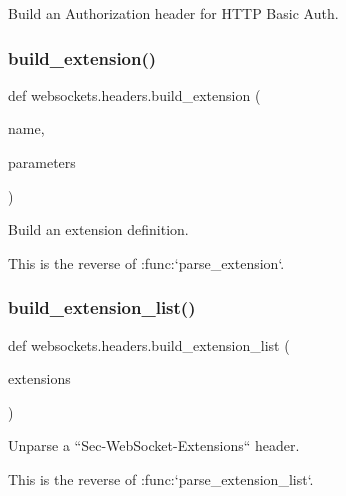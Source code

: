 \begin{DoxyVerb}Build an Authorization header for HTTP Basic Auth.\end{DoxyVerb}
 \mbox{\label{namespacewebsockets_1_1headers_ae0d3fad127ef68b2c2f7976c98966011}} 
\subsubsection{\texorpdfstring{build\+\_\+extension()}{build\_extension()}}
{\footnotesize\ttfamily def websockets.\+headers.\+build\+\_\+extension (\begin{DoxyParamCaption}\item[{}]{name,  }\item[{}]{parameters }\end{DoxyParamCaption})}

\begin{DoxyVerb}Build an extension definition.

This is the reverse of :func:`parse_extension`.\end{DoxyVerb}
 \mbox{\label{namespacewebsockets_1_1headers_a350e170144d586eb8c0869b706e7ed67}} 
\subsubsection{\texorpdfstring{build\+\_\+extension\+\_\+list()}{build\_extension\_list()}}
{\footnotesize\ttfamily def websockets.\+headers.\+build\+\_\+extension\+\_\+list (\begin{DoxyParamCaption}\item[{}]{extensions }\end{DoxyParamCaption})}

\begin{DoxyVerb}Unparse a ``Sec-WebSocket-Extensions`` header.

This is the reverse of :func:`parse_extension_list`.\end{DoxyVerb}
 \mbox{\label{namespacewebsockets_1_1headers_a84f147056906dab05f8abc2421688d76}} 
